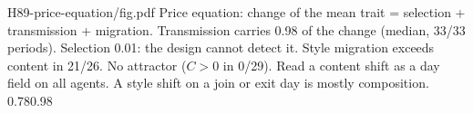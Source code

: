 {H89-price-equation/fig.pdf}
{Price equation: change of the mean trait = selection + transmission + migration.}
{Transmission carries 0.98 of the change (median, 33/33 periods). Selection 0.01: the design cannot detect it. Style migration exceeds content in 21/26. No attractor ($C>0$ in 0/29).}
{Read a content shift as a day field on all agents. A style shift on a join or exit day is mostly composition.}
{0.78}{0.98}
